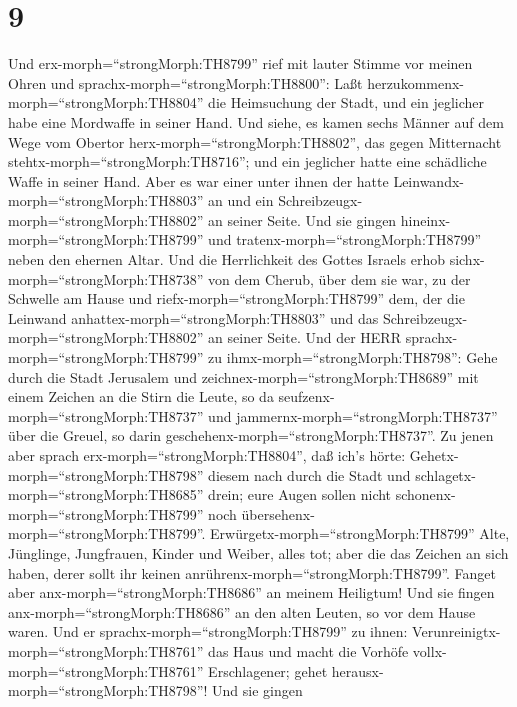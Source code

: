 \hypertarget{section-8}{%
\section{9}\label{section-8}}

 Und erx-morph=``strongMorph:TH8799'' rief mit lauter Stimme
vor meinen Ohren und sprachx-morph=``strongMorph:TH8800'': Laßt
herzukommenx-morph=``strongMorph:TH8804'' die Heimsuchung der Stadt, und
ein jeglicher habe eine Mordwaffe in seiner Hand.  Und
siehe, es kamen sechs Männer auf dem Wege vom Obertor
herx-morph=``strongMorph:TH8802'', das gegen Mitternacht
stehtx-morph=``strongMorph:TH8716''; und ein jeglicher hatte eine
schädliche Waffe in seiner Hand. Aber es war einer unter ihnen der hatte
Leinwandx-morph=``strongMorph:TH8803'' an und ein
Schreibzeugx-morph=``strongMorph:TH8802'' an seiner Seite. Und sie
gingen hineinx-morph=``strongMorph:TH8799'' und
tratenx-morph=``strongMorph:TH8799'' neben den ehernen Altar.
 Und die Herrlichkeit des Gottes Israels erhob
sichx-morph=``strongMorph:TH8738'' von dem Cherub, über dem sie war, zu
der Schwelle am Hause und riefx-morph=``strongMorph:TH8799'' dem, der
die Leinwand anhattex-morph=``strongMorph:TH8803'' und das
Schreibzeugx-morph=``strongMorph:TH8802'' an seiner Seite. 
Und der HERR sprachx-morph=``strongMorph:TH8799'' zu
ihmx-morph=``strongMorph:TH8798'': Gehe durch die Stadt Jerusalem und
zeichnex-morph=``strongMorph:TH8689'' mit einem Zeichen an die Stirn die
Leute, so da seufzenx-morph=``strongMorph:TH8737'' und
jammernx-morph=``strongMorph:TH8737'' über die Greuel, so darin
geschehenx-morph=``strongMorph:TH8737''.  Zu jenen aber
sprach erx-morph=``strongMorph:TH8804'', daß ich's hörte:
Gehetx-morph=``strongMorph:TH8798'' diesem nach durch die Stadt und
schlagetx-morph=``strongMorph:TH8685'' drein; eure Augen sollen nicht
schonenx-morph=``strongMorph:TH8799'' noch
übersehenx-morph=``strongMorph:TH8799''. 
Erwürgetx-morph=``strongMorph:TH8799'' Alte, Jünglinge, Jungfrauen,
Kinder und Weiber, alles tot; aber die das Zeichen an sich haben, derer
sollt ihr keinen anrührenx-morph=``strongMorph:TH8799''. Fanget aber
anx-morph=``strongMorph:TH8686'' an meinem Heiligtum! Und sie fingen
anx-morph=``strongMorph:TH8686'' an den alten Leuten, so vor dem Hause
waren.  Und er sprachx-morph=``strongMorph:TH8799'' zu
ihnen: Verunreinigtx-morph=``strongMorph:TH8761'' das Haus und macht die
Vorhöfe vollx-morph=``strongMorph:TH8761'' Erschlagener; gehet
herausx-morph=``strongMorph:TH8798''! Und sie gingen

